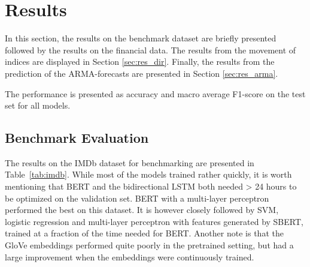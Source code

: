 \chapter{Results}\label{chap:results}

In this section, the results on the benchmark dataset are briefly presented followed by the results on the financial data.
The results from the movement of indices are displayed in Section \ref{sec:res_dir}. Finally, the results from the prediction of the ARMA-forecasts are presented in Section \ref{sec:res_arma}. 

The performance is presented as accuracy and macro average F1-score on the test set for all models. 

\section{Benchmark Evaluation}

The results on the IMDb dataset for benchmarking are presented in Table~\ref{tab:imdb}. While most of the models trained rather quickly, it is worth mentioning that BERT and the bidirectional LSTM both needed > 24 hours to be optimized on the validation set.
BERT with a multi-layer perceptron performed the best on this dataset. It is however closely followed by SVM, logistic regression and multi-layer perceptron with features generated by SBERT, trained at a fraction of the time needed for BERT.
Another note is that the GloVe embeddings performed quite poorly in the pretrained setting, but had a large improvement when the embeddings were continuously trained. 


